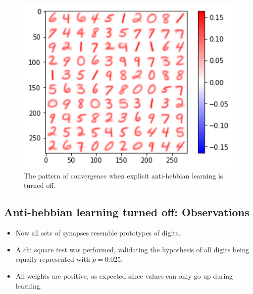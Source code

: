 \documentclass[a4paper]{report}
\begin{document}
\begin{figure} [H]
    \centering
    \includegraphics [width=12cm ] {h/nodelta.png}
    \caption{The pattern of convergence when explicit anti-hebbian learning is turned off.}
    \label{nodelta}
\end{figure}

\subsection{Anti-hebbian learning turned off: Observations}

\begin{itemize}
    \item Now all sets of synapses resemble prototypes of digits.
    \item A chi square test was performed, validating the hypothesis of all digits being equally represented with $p  = 0.025$.
    \item All weights are positive, as expected since values can only go up during learning.
\end{itemize}
\end{document}
